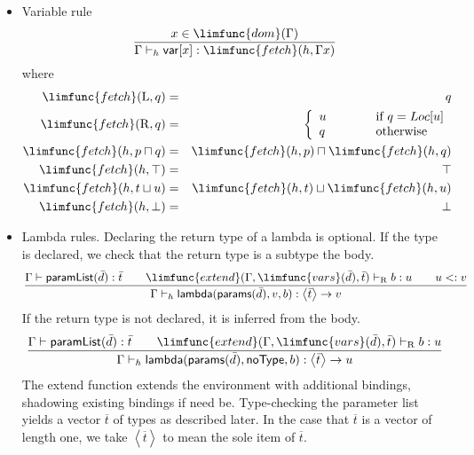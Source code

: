 \documentclass[12pt]{article}
\begin{document}
\begin{itemize}
\item Variable rule%
\begin{equation*}
\frac{x\in \limfunc{dom}(\Gamma )}{\Gamma \vdash _{h}\mathsf{var}[x]:%
\limfunc{fetch}(h,\Gamma x)}
\end{equation*}%
where%
\begin{eqnarray*}
\limfunc{fetch}(\mathrm{L},q) &=&q \\
\limfunc{fetch}(\mathrm{R},q) &=&\left\{ 
\begin{array}{lll}
u & \qquad  & \text{if }q=Loc[u] \\ 
q &  & \text{otherwise}%
\end{array}%
\right.  \\
\limfunc{fetch}(h,p\sqcap q) &=&\limfunc{fetch}(h,p)\sqcap \limfunc{fetch}%
(h,q) \\
\limfunc{fetch}(h,\top ) &=&\top  \\
\limfunc{fetch}(h,t\sqcup u) &=&\limfunc{fetch}(h,t)\sqcup \limfunc{fetch}%
(h,u) \\
\limfunc{fetch}(h,\bot ) &=&\bot 
\end{eqnarray*}

\item Lambda rules. Declaring the return type of a lambda is optional. If
the type is declared, we check that the return type is a subtype the body.%
\begin{equation*}
\frac{\Gamma \vdash \mathsf{paramList}(\bar{d}):\bar{t}\qquad \limfunc{extend%
}(\Gamma ,\limfunc{vars}(\bar{d}),\bar{t})\vdash _{\mathrm{R}}b:u\qquad u<:v%
}{\Gamma \vdash _{h}\mathsf{lambda}(\mathsf{params}(\bar{d}%
),v,b):\left\langle \bar{t}\right\rangle \rightarrow v}
\end{equation*}%
If the return type is not declared, it is inferred from the body.%
\begin{equation*}
\frac{\Gamma \vdash \mathsf{paramList}(\bar{d}):\bar{t}\qquad \limfunc{extend%
}(\Gamma ,\limfunc{vars}(\bar{d}),\bar{t})\vdash _{\mathrm{R}}b:u}{\Gamma
\vdash _{h}\mathsf{lambda}(\mathsf{params}(\bar{d}),\mathsf{noType}%
,b):\left\langle \bar{t}\right\rangle \rightarrow u}
\end{equation*}%
The extend function extends the environment with additional bindings,
shadowing existing bindings if need be. Type-checking the parameter list
yields a vector $\overline{t}$ of types as described later. In the case that 
$\overline{t}$ is a vector of length one, we take $\left\langle \overline{t}%
\right\rangle $ to mean the sole item of $\overline{t}$.


\end{itemize}
\end{document}
